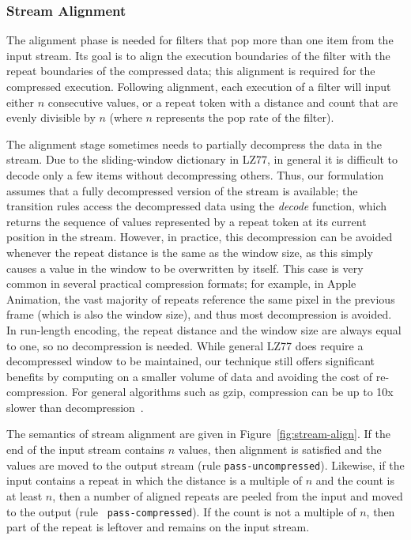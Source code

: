 \subsubsection{Stream Alignment}

The alignment phase is needed for filters that pop more than one item
from the input stream.  Its goal is to align the execution boundaries
of the filter with the repeat boundaries of the compressed data; this
alignment is required for the compressed execution.  Following
alignment, each execution of a filter will input either $n$
consecutive values, or a repeat token with a distance and count that
are evenly divisible by $n$ (where $n$ represents the pop rate of the
filter).

The alignment stage sometimes needs to partially decompress the data
in the stream.  Due to the sliding-window dictionary in LZ77, in
general it is difficult to decode only a few items without
decompressing others.  Thus, our formulation assumes that a fully
decompressed version of the stream is available; the transition rules
access the decompressed data using the \mbox{\it decode} function,
which returns the sequence of values represented by a repeat token at
its current position in the stream.  However, in practice, this
decompression can be avoided whenever the repeat distance is the same
as the window size, as this simply causes a value in the window to be
overwritten by itself.  This case is very common in several practical
compression formats; for example, in Apple Animation, the vast
majority of repeats reference the same pixel in the previous frame
(which is also the window size), and thus most decompression is
avoided.  In run-length encoding, the repeat distance and the window
size are always equal to one, so no decompression is needed.  While
general LZ77 does require a decompressed window to be maintained, our
technique still offers significant benefits by computing on a smaller
volume of data and avoiding the cost of re-compression.  For general
algorithms such as gzip, compression can be up to 10x slower than
decompression~\cite{ziviani00compression}.

The semantics of stream alignment are given in
Figure~\ref{fig:stream-align}.  If the end of the input stream
contains $n$ values, then alignment is satisfied and the values are
moved to the output stream (rule {\tt pass-uncompressed}).  Likewise,
if the input contains a repeat in which the distance is a multiple of
$n$ and the count is at least $n$, then a number of aligned repeats
are peeled from the input and moved to the output (rule {\tt
  pass-compressed}).  If the count is not a multiple of $n$, then part
of the repeat is leftover and remains on the input stream.


